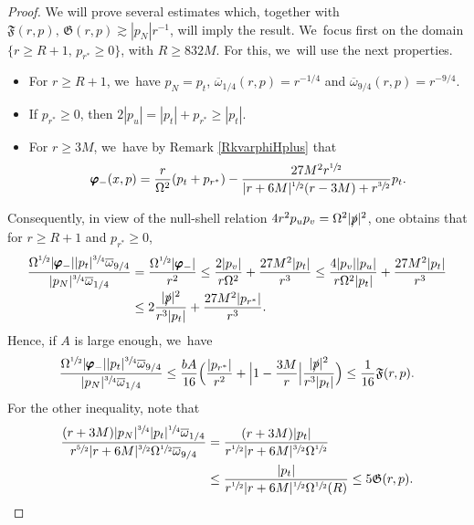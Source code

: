 \documentclass[10pt]{amsart}
\theoremstyle{plain}
\theoremstyle{definition}
\begin{document}
\begin{proof}
We will prove several estimates which, together with $\mathfrak{F}(r,p), \, \mathfrak{G} (r,p) \gtrsim |p_N| r^{-1}$, will imply the result. We~focus first on the domain $\{ r \geq R+1, \, p_{r^*} \geq 0 \}$, with $R \geq 832M$. For this, we~will use the next properties.
\begin{itemize}
\item For $r \geq R+1$, we~have $p_N=p_t$, $\overline{\omega}_{1/4}(r,p)=r^{-1/4}$ and $\overline{\omega}_{9/4}(r,p)=r^{-9/4}$.
\item If $p_{r^*} \geq 0$, then $2|p_u|=|p_t|+p_{r^*}\geq |p_t|$.
\item For $ r \geq 3M$, we~have by Remark \ref{RkvarphiHplus} that\vspace*{-3pt}
\begin{equation*}
\pmb{\varphi}_-(x,p)= \frac{r }{\Omega^2}(p_t+ p_{r^*}) -\frac{27M^2r^{\sfrac{1}{2}}}{|r+6M|^{\sfrac{1}{2}}(r-3M)+r^{\sfrac{3}{2}}} p_t.
\end{equation*}
\end{itemize}
Consequently, in view of the null-shell relation $4r^2p_up_v=\Omega^2 |\slashed{p}|^2$, one obtains that for $r \geq R+1$ and $p_{r^* } \geq 0$,
\begin{align*}
\frac{ \Omega^{\sfrac{1}{2}}|\pmb{\varphi}_-||p_t|^{\sfrac{3}{4}}\overline{\omega}_{9/4}}{ |p_N|^{\sfrac{3}{4}}\overline{\omega}_{1/4}} & = \frac{ \Omega^{\sfrac{1}{2}}|\pmb{\varphi}_-|}{r^2}\leq \frac{2|p_v|}{r\Omega^2}+ \frac{27M^2|p_t|}{r^3} \leq \frac{4|p_v||p_u|}{r\Omega^2|p_t|}+ \frac{27M^2|p_t|}{r^3} \\[-3pt]
&\leq 2\frac{|\slashed{p}|^2}{r^3|p_t|}+\frac{27M^2|p_{r^*}|}{r^3}.
\end{align*}
Hence, if $A$ is large enough, we~have
\[
\frac{ \Omega^{\sfrac{1}{2}}|\pmb{\varphi}_-||p_t|^{\sfrac{3}{4}}\overline{\omega}_{9/4}}{ |p_N|^{\sfrac{3}{4}}\overline{\omega}_{1/4}} \leq \frac{bA}{16} \Bigl(\frac{|p_{r^*}|}{r^2}+ \Bigl |1-\frac{3M}{r} \Bigr| \frac{|\slashed{p}|^2}{r^3 |p_t|} \Bigr) \leq \frac{1}{16} \mathfrak{F}(r,p).
\]
For the other inequality, note that\vspace*{-3pt}\enlargethispage{\baselineskip}
\begin{align*}
\frac{(r+3M)|p_N|^{\sfrac{3}{4}} |p_t|^{\sfrac{1}{4}}\overline{\omega}_{1/4} }{r^{\sfrac{5}{2}}|r+6M|^{\sfrac{3}{2}}\Omega^{\sfrac{1}{2}} \overline{\omega}_{9/4}} &= \frac{(r+3M) |p_t| }{r^{\sfrac{1}{2}}|r+6M|^{\sfrac{3}{2}}\Omega^{\sfrac{1}{2}} }\\
&\leq \frac{|p_t|}{r^{\sfrac{1}{2}}|r+6M|^{\sfrac{1}{2}} \Omega^{\sfrac{1}{2}}(R)} \leq 5 \mathfrak{G}(r,p).
\end{align*}


\end{proof}
\end{document}
